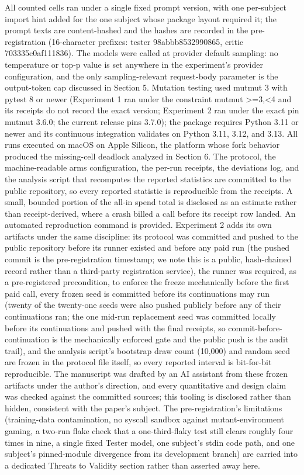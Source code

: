 \documentclass[
  11pt,
]{article}
\begin{document}
All counted cells ran under a single fixed prompt version, with one
per-subject import hint added for the one subject whose package layout
required it; the prompt texts are content-hashed and the hashes are
recorded in the pre-registration (16-character prefixes: tester
98abbb8532990865, critic 703335c0af111836). The models were called at
provider default sampling: no temperature or top-p value is set anywhere
in the experiment's provider configuration, and the only
sampling-relevant request-body parameter is the output-token cap
discussed in Section 5. Mutation testing used mutmut 3 with pytest 8 or newer (Experiment 1 ran
under the constraint mutmut \textgreater=3,\textless4 and its receipts do not
record the exact version; Experiment 2 ran under the exact pin mutmut
3.6.0; the current release pins 3.7.0); the package requires Python 3.11 or newer and its
continuous integration validates on Python 3.11, 3.12, and 3.13. All
runs executed on macOS on Apple Silicon, the platform whose fork
behavior produced the missing-cell deadlock analyzed in Section 6. The
protocol, the machine-readable arms configuration, the per-run receipts,
the deviations log, and the analysis script that recomputes the reported
statistics are committed to the public repository, so every reported
statistic is reproducible from the receipts. A small, bounded portion of
the all-in spend total is disclosed as an estimate rather than
receipt-derived, where a crash billed a call before its receipt row
landed. An automated reproduction command is provided. Experiment 2 adds
its own artifacts under the same discipline: its protocol was committed
and pushed to the public repository before its runner existed and before
any paid run (the pushed commit is the pre-registration timestamp; we
note this is a public, hash-chained record rather than a third-party
registration service), the runner was required, as a pre-registered
precondition, to enforce the freeze mechanically before the first paid
call, every frozen seed is committed before its continuations may run
(twenty of the twenty-one seeds were also pushed publicly before any of
their continuations ran; the one mid-run replacement seed was committed
locally before its continuations and pushed with the final receipts, so
commit-before-continuation is the mechanically enforced gate and the
public push is the audit trail), and the analysis script's bootstrap
draw count (10,000) and random seed are frozen in the protocol file
itself, so every reported interval is bit-for-bit reproducible. The
manuscript was drafted by an AI assistant from these frozen artifacts
under the author's direction, and every quantitative and design claim
was checked against the committed sources; this tooling is disclosed
rather than hidden, consistent with the paper's subject. The
pre-registration's limitations (training-data contamination, no syscall
sandbox against mutant-environment gaming, a two-run flake check that a
one-third-flaky test still clears roughly four times in nine, a single
fixed Tester model, one subject's stdin code path, and one subject's
pinned-module divergence from its development branch) are carried into a
dedicated Threats to Validity section rather than asserted away here.
\end{document}
